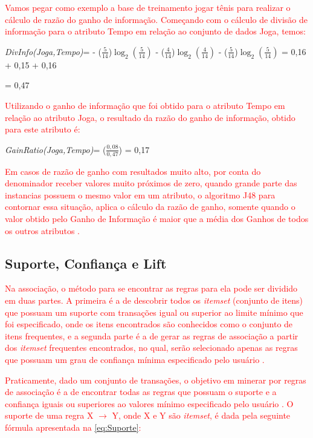 \par
\textcolor{red}{Vamos pegar como exemplo a base de treinamento jogar tênis para realizar o cálculo de razão do ganho de informação. Começando com o cálculo de divisão de informação para o atributo Tempo em relação ao conjunto de dados Joga, temos:}

\textit{DivInfo(Joga,Tempo)}={ - ($\frac{5}{14}$)$\log_{2}(\frac{5}{14})$ - ($\frac{4}{14}$)$\log_{2}(\frac{4}{14})$ - ($\frac{5}{14}$)$\log_{2}(\frac{5}{14})$ = 0,16 + 0,15 + 0,16} 

= 0,47

\par
\textcolor{red}{Utilizando o ganho de informação que foi obtido para o atributo Tempo em relação ao atributo Joga, o resultado da razão do ganho de informação, obtido para este atributo é:}

\textit{GainRatio(Joga,Tempo)}={ ($\frac{0,08}{0,47}$) = 0,17} 

\par
\textcolor{red}{Em casos de razão de ganho com resultados muito alto, por conta do denominador receber valores muito próximos de zero, quando grande parte das instancias possuem o mesmo valor em um atributo, o algoritmo J48 para contornar essa situação, aplica o cálculo da razão de ganho, somente quando o valor obtido pelo Ganho de Informação é maior que a média dos Ganhos de todos os outros atributos \cite{Carvalho2014}.}



\subsection{Suporte, Confiança e Lift}

\par
\textcolor{red}{Na associação, o método para se encontrar as regras para ela pode ser dividido em duas partes. A primeira é a de descobrir todos os \textit{itemset} (conjunto de itens) que possuam um suporte com transações igual ou superior ao limite mínimo que foi especificado, onde os itens encontrados são conhecidos como o conjunto de itens frequentes, e a segunda parte é a de gerar as regras de associação a partir dos \textit{itemset} frequentes encontrados, no qual, serão selecionado apenas as regras que possuam um grau de confiança mínima especificado pelo usuário \cite{Vasconcelos2004, LeandroSilva2014}.}

\textcolor{red}{Praticamente, dado um conjunto de transações, o objetivo em minerar por regras de associação é a de encontrar todas as regras que possuam o suporte e a confiança iguais ou superiores ao valores mínimo especificado pelo usuário \cite{Vasconcelos2004}. O suporte de uma regra X $\rightarrow$ Y, onde X e Y são  \textit{itemset}, é dada pela seguinte fórmula apresentada na \autoref{eq:Suporte}:}


